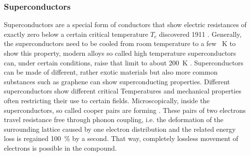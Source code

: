             \subsubsection{Superconductors}
            Superconductors are a special form of conductors that show electric resistances of exactly zero below a certain critical temperature $T_c$ discovered 1911 \cite{onnes_resistance_nodate}. Generally, the superconductors need to be cooled from room temperature to a few \SI{}{\kelvin} to show this property, modern alloys so called high temperature superconductors can, under certain conditions, raise that limit to about \SI{200}{\kelvin} \cite{drozdov_conventional_2015}. Superconductors can be made of different, rather exotic materials but also more common substances such as graphene can show superconducting properties. Different superconductors show different critical Temperatures and mechanical properties often restricting their use to certain fields. Microscopically, inside the superconductors, so called cooper pairs are forming \cite{bardeen_theory_1957}. These pairs of two electrons travel resistance free through phonon coupling, i.e. the deformation of the surrounding lattice caused by one electron distribution and the related energy loss is regained \SI{100}{\percent} by a second. That way, completely lossless movement of electrons is possible in the compound.
